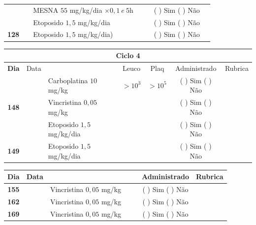 \documentclass[11pt,a4paper,oldfontcommands]{memoir}
\begin{document}
\begin{center}
\begin{table}[H]
\begin{tabular}{p{1cm}c|p{4.8cm}|p{1.8cm}p{1.8cm}|c|c}
    \cline{4-5}
    \multicolumn{1}{c|}{}&&{MESNA \(55\) mg/kg/dia \(\times 0,1 \:e\: 5\)h}&&&{(  ) Sim (  ) Não}&\\
    \multicolumn{1}{c|}{}&&{Etoposido \(1,5\) mg/kg/dia}&&&{(  ) Sim (  ) Não}&\\
    \hline
    \multicolumn{1}{c|}{\multirow{1}{*}{\textbf{128}}}&&{Etoposido \(1,5\) mg/kg/dia)}&{}&&{(  ) Sim (  ) Não}&\\
    \hline
\end{tabular}
\end{table}
\begin{table}[H] \small
\begin{tabular}{p{1cm}c|p{4.8cm}|p{1.8cm}p{1.8cm}|c|c}
	\hline
	\multicolumn{7}{c}{Ciclo 4} \\
	\hline
	\multicolumn{1}{c|}{\multirow{1}{*}{\textbf{Dia}}}&{Data}&{}&\multicolumn{1}{c|}{Leuco}&\multicolumn{1}{c|}{Plaq}&{Administrado}&{Rubrica} \\
    \hline
    \multicolumn{1}{c|}{\multirow{3}{*}{\textbf{148}}}&\multirow{2}{*}{}&{Carboplatina \(10\) mg/kg}&\multicolumn{1}{c|}{\(>10^3\)}&\multicolumn{1}{c|}{\(>10^5\)}&{(  ) Sim (  ) Não}&\\
    \cline{4-5}
    \multicolumn{1}{c|}{}&&{Vincristina \(0,05\) mg/kg}&\multicolumn{1}{c|}{}&&{(  ) Sim (  ) Não}&\\
    \cline{4-5}
    \multicolumn{1}{c|}{}&\multirow{1}{*}{}&{Etoposido \(1,5\) mg/kg/dia}&{}&&{(  ) Sim (  ) Não}&\\
    \cline{1-3}\cline{6-6}
    \multicolumn{1}{c|}{\textbf{149}}&\multirow{1}{*}{}&{Etoposido \(1,5\) mg/kg/dia}&{}&&{(  ) Sim (  ) Não}&\\
    \hline
\end{tabular}
\end{table}
\begin{table}[H] \small
\begin{tabular}{p{1cm}c|p{4.8cm}|p{1.8cm}p{1.8cm}|c|c}
	\hline
	\multicolumn{1}{c|}{\multirow{1}{*}{\textbf{Dia}}}&{Data}&{}&{}&&{Administrado}&{Rubrica} \\
    \hline
    \multicolumn{1}{c|}{\textbf{155}}&&{Vincristina \(0,05\) mg/kg}&\multicolumn{1}{c}{}&&{(  ) Sim (  ) Não}&\\
    \hline
    \multicolumn{1}{c|}{\textbf{162}}&&{Vincristina \(0,05\) mg/kg}&\multicolumn{1}{c}{}&&{(  ) Sim (  ) Não}&\\
    \hline
    \multicolumn{1}{c|}{\textbf{169}}&&{Vincristina \(0,05\) mg/kg}&\multicolumn{1}{c}{}&&{(  ) Sim (  ) Não}&\\

\end{tabular}
\end{table}
\end{center}
\end{document}
